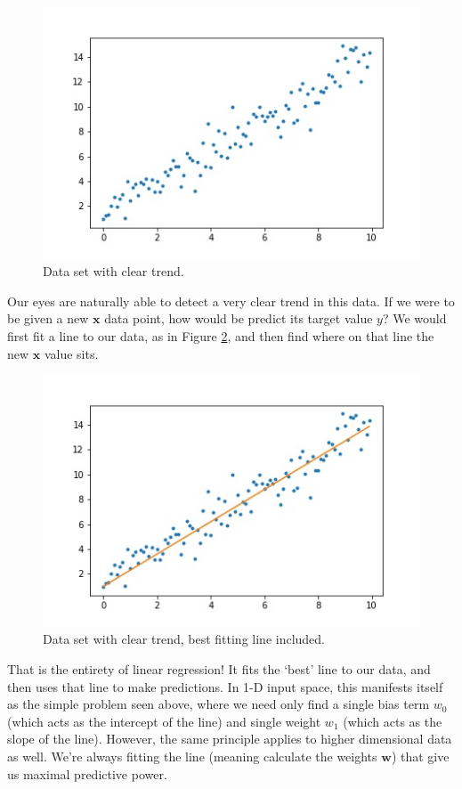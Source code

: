 \begin{figure}
    \centering
    \includegraphics[width=0.5\paperwidth]{../LinearRegression/fig/simple_lin_reg_GEN.jpg}
    \caption{Data set with clear trend.}
    \label{fig:simple-lin-reg}
\end{figure}

Our eyes are naturally able to detect a very clear trend in this data. If we were to be given a new $\textbf{x}$ data point, how would be predict its target value $y$? We would first fit a line to our data, as in Figure \ref{fig:simple-lin-reg-w-line}, and then find where on that line the new $\textbf{x}$ value sits.

\begin{figure}
    \centering
    \includegraphics[width=0.5\paperwidth]{../LinearRegression/fig/simple_lin_reg_w_line_GEN.jpg}
    \caption{Data set with clear trend, best fitting line included.}
    \label{fig:simple-lin-reg-w-line}
\end{figure}

That is the entirety of linear regression! It fits the `best' line to our data, and then uses that line to make predictions. In 1-D input space, this manifests itself as the simple problem seen above, where we need only find a single bias term $w_{0}$ (which acts as the intercept of the line) and single weight $w_{1}$ (which acts as the slope of the line). However, the same principle applies to higher dimensional data as well. We're always fitting the line (meaning calculate the weights $\textbf{w}$) that give us maximal predictive power.

